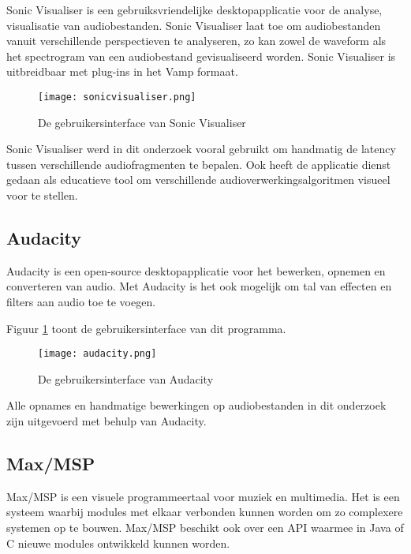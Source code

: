 Sonic Visualiser is een gebruiksvriendelijke desktopapplicatie voor de analyse, visualisatie van audiobestanden. Sonic Visualiser laat toe om audiobestanden vanuit verschillende perspectieven te analyseren, zo kan zowel de waveform als het spectrogram van een audiobestand gevisualiseerd worden. Sonic Visualiser is uitbreidbaar met plug-ins in het Vamp formaat. \cite{cannam2010sonic}

\begin{figure}[!h]
	\captionsetup{width=0.8\textwidth}
	\caption[Gebruikersinterface van Sonic Visualiser]{De gebruikersinterface van Sonic Visualiser}
	\advance\parskip0.3cm
	\centering
	\texttt{[image: sonicvisualiser.png]}
\end{figure}

Sonic Visualiser werd in dit onderzoek vooral gebruikt om handmatig de latency tussen verschillende audiofragmenten te bepalen. Ook heeft de applicatie dienst gedaan als educatieve tool om verschillende audioverwerkingsalgoritmen visueel voor te stellen.
\vspace{0.5cm}

\subsection{Audacity}

Audacity is een open-source desktopapplicatie voor het bewerken, opnemen en converteren van audio. Met Audacity is het ook mogelijk om tal van effecten en filters aan audio toe te voegen.\cite{audacity2016} 

Figuur \ref{screenshot-audacity} toont de gebruikersinterface van dit programma.

\begin{figure}[!h]
	\captionsetup{width=0.8\textwidth}
	\caption[Gebruikersinterface van Audacity]{De gebruikersinterface van Audacity}
	\centering
	\advance\parskip0.3cm
	\texttt{[image: audacity.png]}
	\label{screenshot-audacity}
\end{figure}

Alle opnames en handmatige bewerkingen op audiobestanden in dit onderzoek zijn uitgevoerd met behulp van Audacity. 

\subsection{Max/MSP}

Max/MSP is een visuele programmeertaal voor muziek en multimedia. Het is een systeem waarbij modules met elkaar verbonden kunnen worden om zo complexere systemen op te bouwen. Max/MSP beschikt ook over een API waarmee in Java of C nieuwe modules ontwikkeld kunnen worden. \cite{cycling2016}

